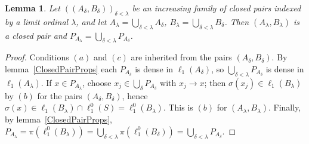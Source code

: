 \documentclass[12pt]{article}
\newtheorem{lemma}[theorem]{Lemma}
\newcommand{\lo}[1]{\ell_1^0(#1)}
\newcommand{\ellone}[1]{\ell_1(#1)}
\begin{document}
\begin{lemma}\label{UnionsOfClosedPairs} Let ${((A_\delta,B_\delta))}_{\delta<\lambda}$
    be an increasing family of closed pairs indexed by a limit ordinal
    $\lambda$, and let $A_\lambda=\bigcup_{\delta<\lambda}A_\delta$,
    $B_\lambda=\bigcup_{\delta<\lambda}B_\delta$. Then $(A_\lambda,B_\lambda)$
    is a closed pair and $P_{A_\lambda}=\bigcup_{\delta<\lambda}P_{A_\delta}$.
\end{lemma}
\begin{proof} Conditions $(a)$ and $(c)$ are inherited from the pairs
    $(A_\delta,B_\delta)$. By lemma~\ref{ClosedPairProps} each $P_{A_\delta}$
    is dense in $\ellone{A_\delta}$, so $\bigcup_{\delta<\lambda}P_{A_\delta}$
    is dense in $\ellone{A_\lambda}$. If $x\in P_{A_\lambda}$, choose
    $x_j\in\bigcup_\delta P_{A_\delta}$ with $x_j\to x$; then
    $\sigma(x_j)\in\ellone{B_\lambda}$ by $(b)$ for the pairs
    $(A_\delta,B_\delta)$, hence $\sigma(x)\in\ellone{B_\lambda}\cap\lo{S}=\lo{B_\lambda}$.
    This is $(b)$ for $(A_\lambda,B_\lambda)$. Finally, by
    lemma~\ref{ClosedPairProps},
    $P_{A_\lambda}=\pi(\lo{B_\lambda})=\bigcup_{\delta<\lambda}\pi(\lo{B_\delta})
    =\bigcup_{\delta<\lambda}P_{A_\delta}$.
\end{proof}
\end{document}

